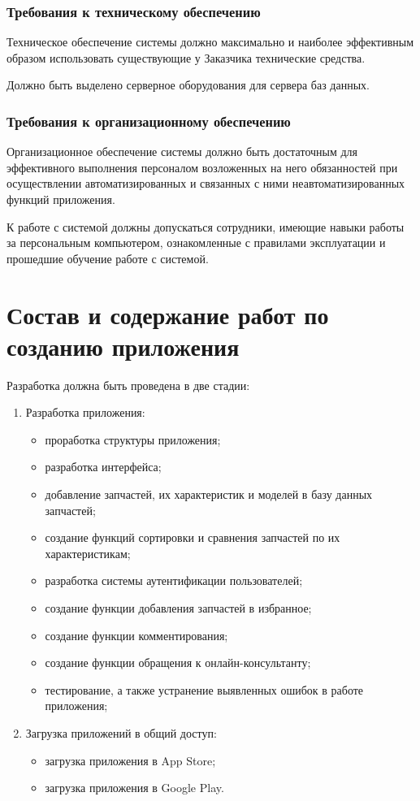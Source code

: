 \documentclass[14pt]{extreport}
\begin{document}
\subsubsection{Требования к техническому обеспечению}
Техническое обеспечение системы должно максимально и наиболее эффективным образом использовать существующие у Заказчика технические средства.

Должно быть выделено серверное оборудования для сервера баз данных.

\subsubsection{Требования к организационному обеспечению}
Организационное обеспечение системы должно быть достаточным для эффективного выполнения персоналом возложенных на него обязанностей при осуществлении автоматизированных и связанных с ними неавтоматизированных функций приложения.

К работе с системой должны допускаться сотрудники, имеющие навыки работы за персональным компьютером, ознакомленные с правилами эксплуатации и прошедшие обучение работе с системой.

\newpage
\section{Состав и содержание работ по созданию приложения}
Разработка должна быть проведена в две стадии:
\begin{enumerate}
	\item Разработка приложения:
	\begin{itemize}
		\item проработка структуры приложения;
		\item разработка интерфейса;
		\item добавление запчастей, их характеристик и моделей в базу данных запчастей;
		\item создание функций сортировки и сравнения запчастей по их характеристикам;
		\item разработка системы аутентификации пользователей;
		\item создание функции добавления запчастей в избранное;
		\item создание функции комментирования;
		\item создание функции обращения к онлайн-консультанту;
		\item тестирование, а также устранение выявленных ошибок в работе приложения;
	\end{itemize}
	\item Загрузка приложений в общий доступ:
	\begin{itemize}
		\item загрузка приложения в App Store;
		\item загрузка приложения в Google Play.
	\end{itemize}
\end{enumerate} 
\end{document}
